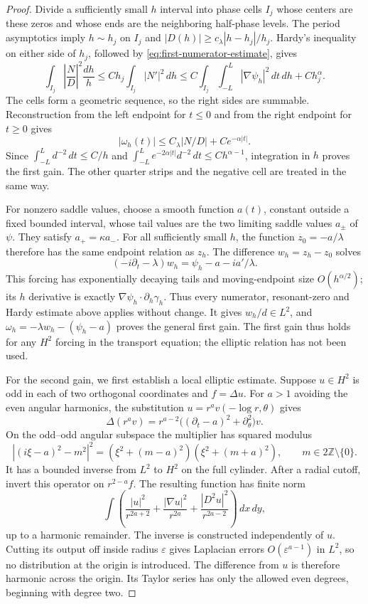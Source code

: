 \documentclass[reqno,11pt]{amsart}
\numberwithin{equation}{section}
\theoremstyle{remark}
\begin{document}
\begin{proof}
Divide a sufficiently small $h$ interval into phase cells $I_j$
whose centers are these zeros and whose ends are the neighboring
half-phase levels.  The period asymptotics imply $h\sim h_j$ on
$I_j$ and
$|D(h)|\geq c_\lambda |h-h_j|/h_j$.
Hardy's inequality on either side of $h_j$, followed by
\eqref{eq:first-numerator-estimate}, gives
\[
 \int_{I_j}\left|\frac ND\right|^2\frac{dh}{h}
 \leq Ch_j\int_{I_j}|N'|^2\,dh
 \leq C\int_{I_j}\int_{-L}^L|\nabla\psi_h|^2\,dt\,dh
          +Ch_j^\alpha.
\]
The cells form a geometric sequence, so the right sides are
summable.  Reconstruction from the left endpoint for $t\leq0$
and from the right endpoint for $t\geq0$ gives
\[
 |\omega_h(t)|\leq C_\lambda|N/D|+Ce^{-\alpha|t|}.
\]
Since $\int_{-L}^Ld^{-2}\,dt\leq C/h$ and
$\int_{-L}^Le^{-2\alpha|t|}d^{-2}\,dt\leq Ch^{\alpha-1}$,
integration in $h$ proves the first gain.  The other quarter
strips and the negative cell are treated in the same way.

For nonzero saddle values, choose a smooth function $a(t)$,
constant outside a fixed bounded interval, whose tail values are
the two limiting saddle values $a_\pm$ of $\psi$.  They satisfy
$a_+=\kappa a_-$.  For all sufficiently small $h$, the function
$z_0=-a/\lambda$ therefore has the same endpoint relation as
$z_h$.  The difference $w_h=z_h-z_0$ solves
\[
 ( -i\partial_t-\lambda)w_h
       =\psi_h-a-i a'/\lambda.
\]
This forcing has exponentially decaying tails and moving-endpoint
size $O(h^{\alpha/2})$; its $h$ derivative is exactly
$\nabla\psi_h\cdot\partial_h\gamma_h$.  Thus every numerator,
resonant-zero and Hardy estimate above applies without change.
It gives $w_h/d\in L^2$, and
$\omega_h=-\lambda w_h-(\psi_h-a)$ proves the general first gain.
The first gain thus holds for any $H^2$ forcing in the transport
equation; the elliptic relation has not been used.

For the second gain, we first establish a local elliptic estimate.
Suppose $u\in H^2$ is odd in each of two orthogonal
coordinates and $f=\Delta u$.  For $a>1$ avoiding
the even angular harmonics, the substitution
$u=r^a v(-\log r,\theta)$ gives
\[
 \Delta(r^av)=r^{a-2}\big((\partial_t-a)^2+\partial_\theta^2\big)v.
\]
On the odd--odd angular subspace the multiplier has squared modulus
\[
 |(i\xi-a)^2-m^2|^2
  =(\xi^2+(m-a)^2)(\xi^2+(m+a)^2),\qquad m\in2\mathbb Z\setminus\{0\}.
\]
It has a bounded inverse from $L^2$ to $H^2$ on the full cylinder.
After a radial cutoff, invert this operator on $r^{2-a}f$.
The resulting function has finite norm
\begin{equation}
 \int\left(\frac{|u|^2}{r^{2a+2}}
 +\frac{|\nabla u|^2}{r^{2a}}
 +\frac{|D^2u|^2}{r^{2a-2}}\right)\,dx\,dy,
 \label{eq:subcritical-elliptic-norm}
\end{equation}
up to a harmonic remainder. The inverse is constructed independently
of $u$. Cutting its
output off inside radius $\varepsilon$ gives Laplacian errors
$O(\varepsilon^{a-1})$ in $L^2$, so no distribution at the origin
is introduced.  The difference from $u$ is therefore harmonic
across the origin.  Its Taylor series has only the allowed even
degrees, beginning with degree two.


\end{proof}
\end{document}
